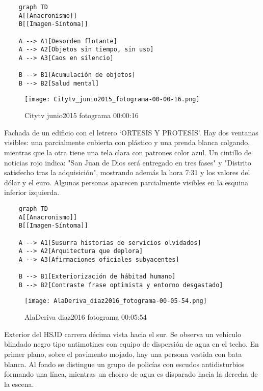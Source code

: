 \small
\singlespacing \begin{verbatim}
    graph TD
    A[[Anacronismo]]
    B[[Imagen-Síntoma]]

    A --> A1[Desorden flotante]
    A --> A2[Objetos sin tiempo, sin uso]
    A --> A3[Caos en silencio]

    B --> B1[Acumulación de objetos]
    B --> B2[Salud mental]
\end{verbatim}
\normalsize

\clearpage
\begin{figure}[h!]
    \centering
    \texttt{[image: Citytv\_junio2015\_fotograma-00-00-16.png]}
    \caption{Citytv junio2015 fotograma 00:00:16}
    \label{fig:Citytv_junio2015_fotograma_00_00_16}
\end{figure}

Fachada de un edificio con el letrero `ORTESIS Y PROTESIS'. Hay dos ventanas visibles: una parcialmente cubierta con plástico y una prenda blanca colgando, mientras que la otra tiene una tela clara con patrones color azul. Un cintillo de noticias rojo indica: "San Juan de Dios será entregado en tres fases" y "Distrito satisfecho tras la adquisición", mostrando además la hora 7:31 y los valores del dólar y el euro. Algunas personas aparecen parcialmente visibles en la esquina inferior izquierda. \parencite[fotograma: 00:00:16]{CitytvJunio2015}

\small
\singlespacing \begin{verbatim}
    graph TD
    A[[Anacronismo]]
    B[[Imagen-Síntoma]]
    
    A --> A1[Susurra historias de servicios olvidados]
    A --> A2[Arquitectura que deplora]
    A --> A3[Afirmaciones oficiales subyacentes]
    
    B --> B1[Exteriorización de hábitad humano]
    B --> B2[Contraste frase optimista y entorno desgastado]
\end{verbatim}
\normalsize

\clearpage
\begin{figure}[h!]
    \centering
    \texttt{[image: AlaDeriva\_diaz2016\_fotograma-00-05-54.png]}
    \caption{AlaDeriva diaz2016 fotograma 00:05:54}
    \label{fig:AlaDeriva_diaz2016_fotograma_00_05_54}
\end{figure}

Exterior del HSJD carrera décima vista hacia el sur. Se observa un vehículo blindado negro tipo antimotines con equipo de dispersión de agua en el techo. En primer plano, sobre el pavimento mojado, hay una persona vestida con bata blanca. Al fondo se distingue un grupo de policías con escudos antidisturbios formando una línea, mientras un chorro de agua es disparado hacia la derecha de la escena. \parencite[fotograma: 00:05:54]{AlaDerivaDiaz2016}

